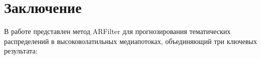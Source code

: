 \documentclass[14pt,a4paper]{article}
\begin{document}



\newpage
\section{Заключение}
\label{ssec:conclusion}

В работе представлен метод ARFilter для прогнозирования тематических распределений в высоковолатильных медиапотоках, объединяющий три ключевых результата:
\end{document}
